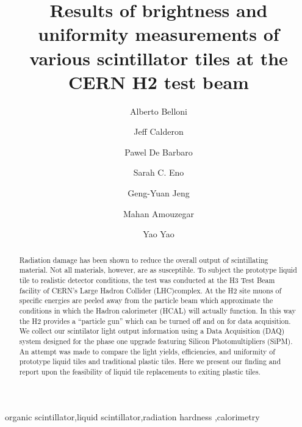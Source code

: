 \documentclass[review]{elsarticle}
\begin{document}
\begin{frontmatter}

\title{Results of brightness and uniformity measurements of various scintillator tiles at the CERN H2 test beam}


\author[umd]{Alberto Belloni}
\author[umd]{Jeff Calderon}
\author[rochester]{Pawel De Barbaro}
\author[umd]{Sarah C. Eno}
\author[umd]{Geng-Yuan Jeng}
\author[umd]{Mahan Amouzegar}
\author[umd]{Yao Yao}

\address[umd]{Dept. Physics, U. Maryland, College Park MD 30742 USA}
\address[rochester]{The University of Rochester, Rochester, NY, USA}

\begin{abstract}
Radiation damage has been shown to reduce the overall output of scintillating material.
Not all materials, however, are as susceptible.
To subject the prototype liquid tile to realistic detector conditions, the test was conducted at the H3 Test Beam facility of CERN's Large Hadron Collider (LHC)complex. 
At the H2 site muons of specific energies are peeled away from the particle beam which approximate the conditions in which the Hadron calorimeter (HCAL) will actually function. 
In this way the H2 provides a “particle gun” which can be turned off and on for data acquisition. 
We collect our scintilator light output information using a Data Acquisition (DAQ) system designed for the phase one upgrade featuring Silicon Photomultipliers (SiPM). 
An attempt was made to compare the light yields, efficiencies, and uniformity of prototype liquid tiles and traditional plastic tiles. 
Here we present our finding and report upon the feasibility of liquid tile replacements to exiting plastic tiles.
\end{abstract}

\begin{keyword}
organic scintillator\sep liquid scintillator\sep radiation
hardness \sep calorimetry
\end{keyword}

\end{frontmatter}

\linenumbers
\end{document}
